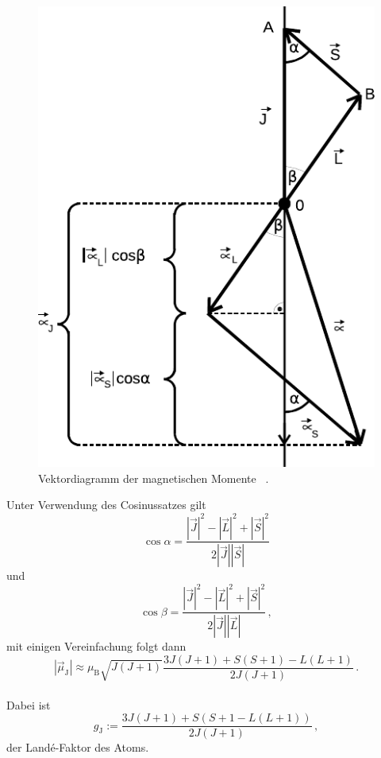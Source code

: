 \begin{figure}[H]
    \centering
    \includegraphics{figures/Abb_1.pdf}
    \caption{Vektordiagramm der magnetischen Momente $\,$ \cite{ap07}.}
    \label{fig:abb1}
\end{figure} 

Unter Verwendung des Cosinussatzes gilt
\begin{equation*}
    \cos\alpha = \dfrac{|\vec{J}|^2 - |\vec{L}|^2 + |\vec{S}|^2}{2|\vec{J}| |\vec{S}|}
\end{equation*}
und
\begin{equation*}
    \cos\beta = \dfrac{|\vec{J}|^2 - |\vec{L}|^2 + |\vec{S}|^2}{2|\vec{J}| |\vec{L}|} \,,
\end{equation*}
mit einigen Vereinfachung folgt dann
\begin{equation*}
    |\vec{\mu}_\text{J}| \approx \mu_\text{B} \sqrt{J(J + 1)} \dfrac{3 J (J + 1) + {S(S + 1) - L(L +1)}}{2J(J + 1)} \,.
\end{equation*} \\

Dabei ist 
\begin{equation}
    g_\text{J} := \dfrac{3 J(J + 1) + {S(S + 1 - L(L + 1))}}{2 J(J + 1)} \,,
    \label{eq:lande-faktor}
\end{equation}
der Landé-Faktor des Atoms. \\

